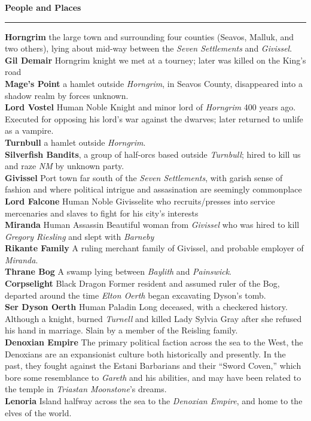 \documentclass[letterpaper]{article}
\newcommand{\e}[1]{\emph{#1}}
\newcommand{\B}[1]{\textbf{#1}}
\newenvironment{notesection}[1]
{ {\huge \B{#1}}\hrule\vspace{0.5em}\begingroup\fontsize{9pt}{12pt}\selectfont}
{\endgroup}
\newcommand{\person}[3]{\B{#1
    \ifstrequal{#2}{M}{{\color{ProcessBlue}\male}}{%
    \ifstrequal{#2}{F}{\color{VioletRed}\female}{}}}{\scriptsize #3}}
\begin{document}
\begin{notesection}{People and Places}
\B{Horngrim} the large town and surrounding four counties (Seavos, Malluk, and two others), lying about mid-way between the \e{Seven Settlements} and \e{Givissel}.\\
\person{Gil Demair} \e{Horngrim} knight we met at a tourney; later was killed on the King's road\\
\B{Mage's Point} a hamlet outside \e{Horngrim}, in Seavos County, disappeared into a shadow realm by forces unknown.\\
\person{Lord Vostel}{M}{Human Noble} Knight and minor lord of \e{Horngrim} 400 years ago. Executed for opposing his lord's war against the dwarves; later returned to unlife as a vampire.\\
\B{Turnbull} a hamlet outside \e{Horngrim}.\\
\B{Silverfish Bandits}, a group of half-orcs based outside \e{Turnbull}; hired to kill us and raze \e{NM} by unknown party.\\

\B{Givissel} Port town far south of the \e{Seven Settlements}, with garish sense of fashion and where political intrigue and assasination are seemingly commonplace \\
\person{Lord Falcone}{M}{Human Noble} Givisselite who recruits/presses into service mercenaries and slaves to fight for his city's interests\\
\person{Miranda}{F}{Human Assassin} Beautiful woman from \e{Givissel} who was hired to kill \e{Gregory Riesling} and slept with \e{Barneby} \\
\B{Rikante Family} A ruling merchant family of Givissel, and probable employer of \e{Miranda}.\\

\B{Thrane Bog} A swamp lying between \e{Baylith} and \e{Painswick}.\\
\person{Corpselight}{F}{Black Dragon} Former resident and assumed ruler of the Bog, departed around the time \e{Elton Oerth} began excavating Dyson's tomb.\\
\person{Ser Dyson Oerth}{M}{Human Paladin} Long deceased, with a checkered history. Although a knight, burned \e{Turnell} and killed Lady Sylvia Gray after she refused his hand in marriage. Slain by a member of the Reisling family.\\

\B{Denoxian Empire} The primary political faction across the sea to the West, the Denoxians are an expansionist culture both historically and presently. In the past, they fought against the Estani Barbarians and their ``Sword Coven,'' which bore some resemblance to \e{Gareth} and his abilities, and may have been related to the temple in \e{Triastan Moonstone}'s dreams.\\
\B{Lenoria} Island halfway across the sea to the \e{Denoxian Empire}, and home to the elves of the world.\\
\end{notesection}
\end{document}
